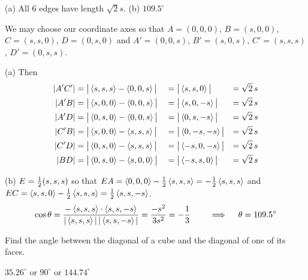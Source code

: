 \begin{answer}
(a) All $6$ edges have length $\sqrt{2}s$.\qquad
(b) $109.5^\circ$
\end{answer}

\begin{solution}
We may choose our coordinate axes so that $A=(0,0,0)$,  $B=(s,0,0)$,
$C=(s,s,0)$, $D=(0,s,0)$ and $A'=(0,0,s)$, $B'=(s,0,s)$,
$C'=(s,s,s)$, $D'=(0,s,s)$.

(a) Then
\begin{alignat*}{5}
|A'C'|&=\big|\left< s,s,s\right> -\left< 0,0,s\right> \big|
      &&=\big|\left< s,s,0\right> \big|&=\sqrt{2}\,s\\
|A'B|&=\big|\left< s,0,0\right> -\left< 0,0,s\right> \big|
     &&=\big|\left< s,0,-s\right> \big|&=\sqrt{2}\,s\\
|A'D|&=\big|\left< 0,s,0\right> -\left< 0,0,s\right> \big|
     &&=\big|\left< 0,s,-s\right> \big|&=\sqrt{2}\,s\\
|C'B|&=\big|\left< s,0,0\right> -\left< s,s,s\right> \big|
     &&=\big|\left< 0,-s,-s\right> \big|&=\sqrt{2}\,s\\
|C'D|&=\big|\left< 0,s,0\right> -\left< s,s,s\right> \big|
     &&=\big|\left< -s,0,-s\right> \big|&=\sqrt{2}\,s\\
|BD|&=\big|\left< 0,s,0\right> -\left< s,0,0\right> \big|
    &&=\big|\left< -s,s,0\right> \big|&=\sqrt{2}\,s
\end{alignat*}

(b) $E=\tfrac{1}{2}(s,s,s)$ so that $EA=\left< 0,0,0\right> -\tfrac{1}{2}\left< s,s,s\right> 
      =-\tfrac{1}{2}\left< s,s,s\right> $ and 
$EC=\left< s,s,0\right> -\tfrac{1}{2}\left< s,s,s\right> =\tfrac{1}{2}\left< s,s,-s\right> $.
$$
\cos\theta =\frac{-\left< s,s,s\right> \cdot\left< s,s,-s\right>}
                 {|\left< s,s,s\right> |\,|\left< s,s,-s\right> |}
        =\frac{-s^2}{3s^2}
        =-\frac{1}{3}
\qquad \implies\quad \theta=109.5^\circ
$$
\end{solution}

\begin{question}
Find the angle between the diagonal of a cube and the diagonal
of one of its faces.
\end{question}

%

\begin{answer}
$35.26^\circ$ or $90^\circ$ or $144.74^\circ$
\end{answer}

